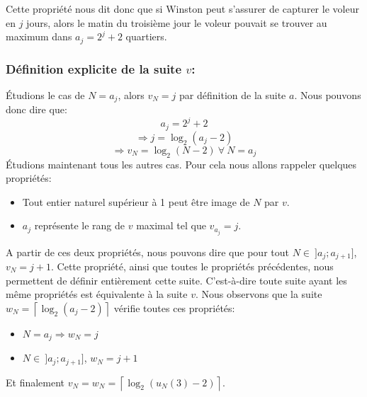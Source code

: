 \hspace{1cm}

Cette propriété nous dit donc que si Winston peut s'assurer de capturer le voleur en $j$ jours, alors le matin du troisième jour le voleur pouvait se trouver au maximum dans $a_j=2^{j}+2$ quartiers.

\subsubsection{Définition explicite de la suite $v$:}

Étudions le cas de $N=a_j$, alors $v_N=j$ par définition de la suite $a$. Nous pouvons donc dire que: 
$$a_j=2^j+2$$
$$\Rightarrow j=\log_2(a_j-2)$$
$$\Rightarrow v_N=\log_2(N-2)\:\forall\: N=a_j$$
Étudions maintenant tous les autres cas. Pour cela nous allons rappeler quelques propriétés:
\begin{itemize}
    \item Tout entier naturel supérieur à 1 peut être image de $N$ par $v$.
    \item $a_j$ représente le rang de $v$ maximal tel que $v_{a_j}=j$.
\end{itemize}
A partir de ces deux propriétés, nous pouvons dire que pour tout $N\in\:]a_j;a_{j+1}]$, $v_N=j+1$.
Cette propriété, ainsi que toutes le propriétés précédentes, nous permettent de définir entièrement cette suite. C'est-à-dire toute suite ayant les même propriétés est équivalente à la suite $v$.
Nous observons que la suite $w_N=\left\lceil \log_2(a_j-2)\right\rceil$ vérifie toutes ces propriétés:
\begin{itemize}
    \item $N=a_j\Rightarrow w_N=j$
    \item $N\in\:]a_j;a_{j+1}]$, $w_N=j+1$
\end{itemize}
Et finalement $v_N=w_N=\left\lceil \log_2(u_N(3)-2)\right\rceil$.

